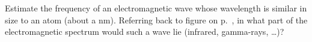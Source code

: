 Estimate the frequency of an electromagnetic wave whose
wavelength is similar in size to an atom (about a nm).
Referring back to figure  on p.~\pageref{fig:em-spectrum}, in
what part of the electromagnetic spectrum would such a wave
lie (infrared, gamma-rays, \ldots)?
